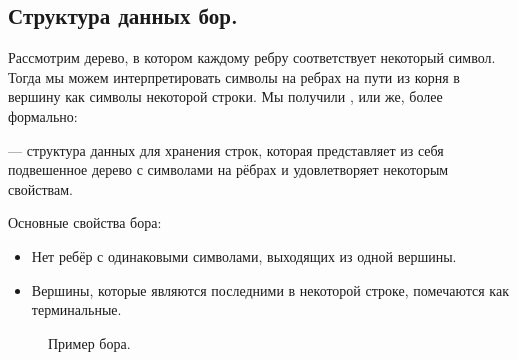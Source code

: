 \subsection{Структура данных бор.}
Рассмотрим дерево, в котором каждому ребру соответствует некоторый символ.
Тогда мы можем интерпретировать символы на ребрах на пути из корня в вершину как символы некоторой строки.
Мы получили , или же, более формально:

\begin{definition}
         --- структура данных для хранения строк, которая представляет из себя 
        подвешенное дерево с символами на рёбрах и удовлетворяет некоторым свойствам.
\end{definition}

Основные свойства бора:
\begin{itemize}
        \item Нет ребёр с одинаковыми символами, выходящих из одной вершины.
        \item Вершины, которые являются последними в некоторой строке, помечаются как терминальные. 
\end{itemize}

\begin{figure}[htbp]
        \caption*{Пример бора.}
        \begin{center}
        \end{center}
\end{figure}

